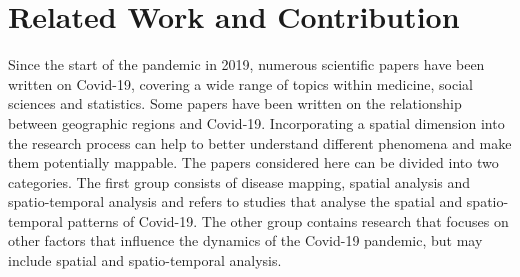 \section{Related Work and Contribution}
Since the start of the pandemic in 2019, numerous scientific papers have been written on Covid-19, covering a wide range of topics within medicine, social sciences and statistics. Some papers have been written on the relationship between geographic regions and Covid-19. Incorporating a spatial dimension into the research process can help to better understand different phenomena and make them potentially mappable. The papers considered here can be divided into two categories. The first group consists of disease mapping, spatial analysis and spatio-temporal analysis and refers to studies that analyse the spatial and spatio-temporal patterns of Covid-19. The other group contains research that focuses on other factors that influence the dynamics of the Covid-19 pandemic, but may include spatial and spatio-temporal analysis.
